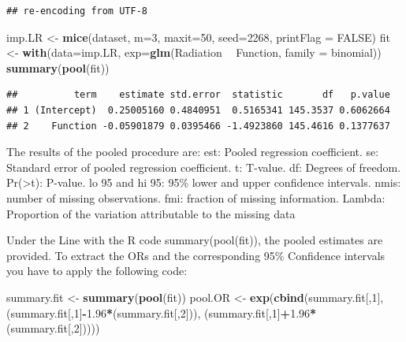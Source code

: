 \documentclass[
]{book}
\newenvironment{Shaded}{\begin{snugshade}}{\end{snugshade}}
\newcommand{\DataTypeTok}[1]{\textcolor[rgb]{0.13,0.29,0.53}{#1}}
\newcommand{\DecValTok}[1]{\textcolor[rgb]{0.00,0.00,0.81}{#1}}
\newcommand{\FloatTok}[1]{\textcolor[rgb]{0.00,0.00,0.81}{#1}}
\newcommand{\KeywordTok}[1]{\textcolor[rgb]{0.13,0.29,0.53}{\textbf{#1}}}
\newcommand{\NormalTok}[1]{#1}
\newcommand{\OperatorTok}[1]{\textcolor[rgb]{0.81,0.36,0.00}{\textbf{#1}}}
\newcommand{\OtherTok}[1]{\textcolor[rgb]{0.56,0.35,0.01}{#1}}
\newcommand{\StringTok}[1]{\textcolor[rgb]{0.31,0.60,0.02}{#1}}
\begin{document}
\begin{verbatim}
## re-encoding from UTF-8
\end{verbatim}

\begin{Shaded}
\begin{Highlighting}[]
\NormalTok{imp.LR <-}\StringTok{ }\KeywordTok{mice}\NormalTok{(dataset, }\DataTypeTok{m=}\DecValTok{3}\NormalTok{, }\DataTypeTok{maxit=}\DecValTok{50}\NormalTok{, }\DataTypeTok{seed=}\DecValTok{2268}\NormalTok{, }\DataTypeTok{printFlag =} \OtherTok{FALSE}\NormalTok{)}
\NormalTok{fit <-}\StringTok{ }\KeywordTok{with}\NormalTok{(}\DataTypeTok{data=}\NormalTok{imp.LR, }\DataTypeTok{exp=}\KeywordTok{glm}\NormalTok{(Radiation }\OperatorTok{~}\StringTok{ }\NormalTok{Function, }\DataTypeTok{family =}\NormalTok{ binomial))}
\KeywordTok{summary}\NormalTok{(}\KeywordTok{pool}\NormalTok{(fit))}
\end{Highlighting}
\end{Shaded}

\begin{verbatim}
##          term    estimate std.error  statistic       df   p.value
## 1 (Intercept)  0.25005160 0.4840951  0.5165341 145.3537 0.6062664
## 2    Function -0.05901879 0.0395466 -1.4923860 145.4616 0.1377637
\end{verbatim}

The results of the pooled procedure are: est: Pooled regression
coefficient. se: Standard error of pooled regression coefficient. t:
T-value. df: Degrees of freedom. Pr(\textgreater\textbar t\textbar):
P-value. lo 95 and hi 95: 95\% lower and upper confidence intervals.
nmis: number of missing observations. fmi: fraction of missing
information. Lambda: Proportion of the variation attributable to the
missing data

Under the Line with the R code summary(pool(fit)), the pooled estimates
are provided. To extract the ORs and the corresponding 95\% Confidence
intervals you have to apply the following code:

\begin{Shaded}
\begin{Highlighting}[]
\NormalTok{summary.fit <-}\StringTok{ }\KeywordTok{summary}\NormalTok{(}\KeywordTok{pool}\NormalTok{(fit))}
\NormalTok{pool.OR <-}\StringTok{ }\KeywordTok{exp}\NormalTok{(}\KeywordTok{cbind}\NormalTok{(summary.fit[,}\DecValTok{1}\NormalTok{], (summary.fit[,}\DecValTok{1}\NormalTok{]}\OperatorTok{-}\FloatTok{1.96}\OperatorTok{*}\NormalTok{(summary.fit[,}\DecValTok{2}\NormalTok{])), }
\NormalTok{           (summary.fit[,}\DecValTok{1}\NormalTok{]}\OperatorTok{+}\FloatTok{1.96}\OperatorTok{*}\NormalTok{(summary.fit[,}\DecValTok{2}\NormalTok{]))))}
\end{Highlighting}
\end{Shaded}
\end{document}
